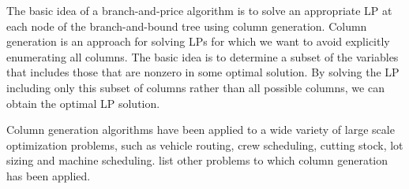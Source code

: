 

The basic idea of a branch-and-price algorithm is to solve an appropriate LP at 
each node of the branch-and-bound tree using column generation. 
Column generation is an approach for solving LPs for which we want to avoid 
explicitly enumerating all columns. The basic idea is to determine a subset of 
the variables that includes those that are nonzero in some optimal solution. 
By solving the LP including only this subset of columns rather than all possible 
columns, we can obtain the optimal LP solution. 

Column generation algorithms have been applied to a wide variety of large scale 
optimization problems, such as vehicle routing, crew scheduling, cutting stock, 
lot sizing and machine scheduling.  
\citet{Lubbecke} list other problems to which column generation has been applied.

